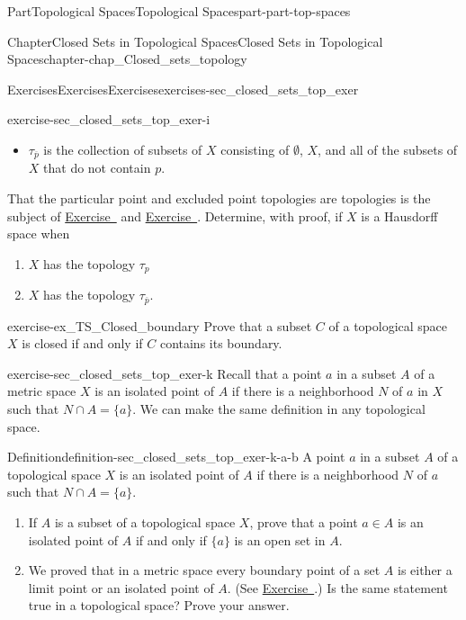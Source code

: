 \documentclass[oneside,10pt,]{book}
\newcommand{\xreffont}{\relax}
\numberwithin{equation}{chapter}
\begin{document}
\begin{partptx}{Part}{Topological Spaces}{}{Topological Spaces}{}{}{part-part-top-spaces}
\begin{chapterptx}{Chapter}{Closed Sets in Topological Spaces}{}{Closed Sets in Topological Spaces}{}{}{chapter-chap_Closed_sets_topology}
\begin{exercises-section}{Exercises}{Exercises}{}{Exercises}{}{}{exercises-sec_closed_sets_top_exer}
\begin{divisionexercise}{9}{}{}{exercise-sec_closed_sets_top_exer-i}
\begin{itemize}[label=\textbullet]
\item{}\(\tau_{\overline{p}}\) is the collection of subsets of \(X\) consisting of \(\emptyset\), \(X\), and all of the subsets of \(X\) that do not contain \(p\).%
\end{itemize}
That the particular point and excluded point topologies are topologies is the subject of \hyperlink{exercise-ex_particular_point_topology}{Exercise~{\xreffont 9}} and \hyperlink{exercise-ex_excluded_point_topology}{Exercise~{\xreffont 10}}. Determine, with proof, if \(X\) is a Hausdorff space when%
\begin{enumerate}[font=\bfseries,label=(\alph*),ref=\alph*]%
\item{}\(X\) has the topology \(\tau_{p}\)%
\item{}\(X\) has the topology \(\tau_{\overline{p}}\).%
\end{enumerate}%
\end{divisionexercise}%
\begin{divisionexercise}{10}{}{}{exercise-ex_TS_Closed_boundary}%
Prove that a subset \(C\) of a topological space \(X\) is closed if and only if \(C\) contains its boundary.%
\end{divisionexercise}%
\begin{divisionexercise}{11}{}{}{exercise-sec_closed_sets_top_exer-k}%
Recall that a point \(a\) in a subset \(A\) of a metric space \(X\) is an isolated point of \(A\) if there is a neighborhood \(N\) of \(a\) in \(X\) such that \(N \cap A = \{a\}\). We can make the same definition in any topological space.%
\begin{definition}{Definition}{}{definition-sec_closed_sets_top_exer-k-a-b}%
A point \(a\) in a subset \(A\) of a topological space \(X\) is an isolated point of \(A\)  if there is a neighborhood \(N\) of \(a\) such that \(N \cap A = \{a\}\).%
\end{definition}
\begin{enumerate}[font=\bfseries,label=(\alph*),ref=\alph*]%
\item{}If \(A\) is a subset of a topological space \(X\), prove that a point \(a \in A\) is an isolated point of \(A\) if and only if \(\{a\}\) is an open set in \(A\).%
\item{}We proved that in a metric space every boundary point of a set \(A\) is either a limit point or an isolated point of \(A\). (See \hyperlink{exercise-ex_MS_boundary_limit_isolated}{Exercise~{\xreffont 12}}.) Is the same statement true in a topological space? Prove your answer.%
\end{enumerate}%

\end{divisionexercise}
\end{exercises-section}
\end{chapterptx}
\end{partptx}
\end{document}
